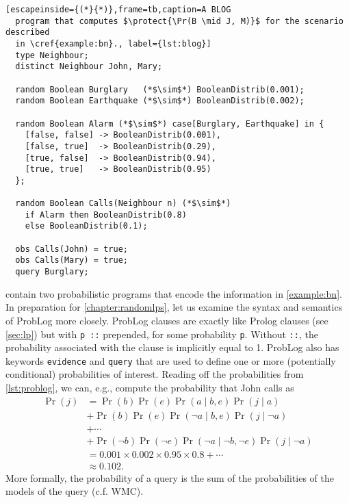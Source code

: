 \noindent\begin{minipage}{\linewidth}
\begin{lstlisting}[escapeinside={(*}{*)},frame=tb,caption=A BLOG
  program that computes $\protect{\Pr(B \mid J, M)}$ for the scenario described
  in \cref{example:bn}., label={lst:blog}]
  type Neighbour;
  distinct Neighbour John, Mary;

  random Boolean Burglary   (*$\sim$*) BooleanDistrib(0.001);
  random Boolean Earthquake (*$\sim$*) BooleanDistrib(0.002);

  random Boolean Alarm (*$\sim$*) case[Burglary, Earthquake] in {
    [false, false] -> BooleanDistrib(0.001),
    [false, true]  -> BooleanDistrib(0.29),
    [true, false]  -> BooleanDistrib(0.94),
    [true, true]   -> BooleanDistrib(0.95)
  };

  random Boolean Calls(Neighbour n) (*$\sim$*)
    if Alarm then BooleanDistrib(0.8)
    else BooleanDistrib(0.1);

  obs Calls(John) = true;
  obs Calls(Mary) = true;
  query Burglary;
\end{lstlisting}
\end{minipage}

 contain two probabilistic programs that encode the
information in \cref{example:bn}. In preparation for \cref{chapter:randomlps},
let us examine the syntax and semantics of ProbLog more closely. ProbLog clauses
are exactly like Prolog clauses (see \cref{sec:lp}) but with \verb+p ::+
prepended, for some probability \texttt{p}. Without \verb+::+, the probability
associated with the clause is implicitly equal to 1. ProbLog also has keywords
\texttt{evidence} and \texttt{query} that are used to define one or more
(potentially conditional) probabilities of interest. Reading off the
probabilities from \cref{lst:problog}, we can, e.g., compute the probability
that John calls as
\begin{align*}
  \Pr(j) &= \Pr(b)\Pr(e)\Pr(a \mid b, e)\Pr(j \mid a) \\
  &+ \Pr(b)\Pr(e)\Pr(\neg a \mid b, e)\Pr(j \mid \neg a) \\
  &+ \cdots \\
  &+ \Pr(\neg b)\Pr(\neg e)\Pr(\neg a \mid \neg b, \neg e)\Pr(j \mid \neg a) \\
  &= 0.001 \times 0.002 \times 0.95 \times 0.8 + \cdots \\
  &\approx 0.102.
\end{align*}
More formally, the probability of a query is the sum of the probabilities of the
models of the query (c.f. WMC).

